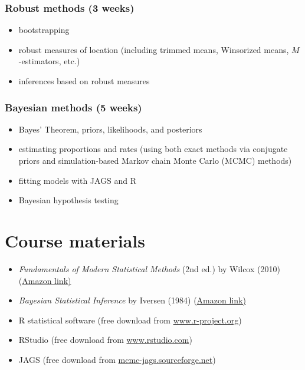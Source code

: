 \documentclass[10pt]{article}
\begin{document}
\subsubsection*{Robust methods (3 weeks)}
\label{sec-2-0-2}
\begin{itemize}
\item bootstrapping
\item robust measures of location (including trimmed means, Winsorized means, $M$-estimators, etc.)
\item inferences based on robust measures
\end{itemize}

\subsubsection*{Bayesian methods (5 weeks)}
\label{sec-2-0-3}
\begin{itemize}
\item Bayes' Theorem, priors, likelihoods, and posteriors
\item estimating proportions and rates (using both exact methods via conjugate priors and simulation-based Markov chain Monte Carlo (MCMC) methods)
\item fitting models with JAGS and R
\item Bayesian hypothesis testing
\end{itemize}

\section*{Course materials}
\label{sec-3}

\begin{itemize}
\item \emph{Fundamentals of Modern Statistical Methods} (2nd ed.) by Wilcox (2010) (\href{https://www.amazon.com/Fundamentals-Modern-Statistical-Methods-Substantially/dp/1441955240/}{Amazon link)}
\item \emph{Bayesian Statistical Inference} by Iversen (1984) (\href{https://www.amazon.com/Bayesian-Statistical-Inference-Quantitative-Applications/dp/0803923287/}{Amazon link)}
\item R statistical software (free download from \href{http://www.r-project.org}{www.r-project.org})
\item RStudio (free download from \href{http://www.rstudio.com}{www.rstudio.com})
\item JAGS (free download from \href{http://mcmc-jags.sourceforge.net}{mcmc-jags.sourceforge.net})
\end{itemize}
\end{document}
